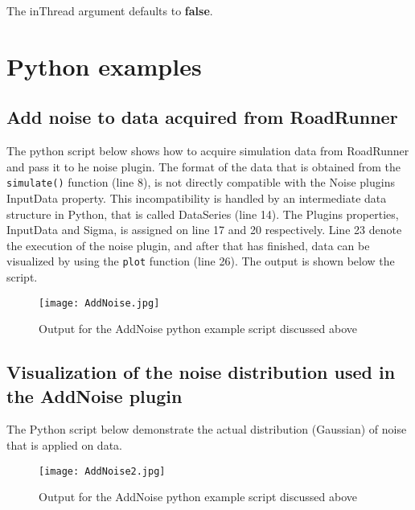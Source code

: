The inThread argument defaults to \textbf{false}.

\section{Python examples}

\subsection{Add noise to data acquired from RoadRunner}
The python script below shows how to acquire simulation data from RoadRunner and pass it to he noise plugin. The format of the data that is obtained from the \verb|simulate()| function (line 8), is not directly compatible with the Noise plugins InputData property. This incompatibility is handled by an intermediate data structure in Python, that is called DataSeries (line 14). 
The Plugins properties, InputData and Sigma, is assigned on line 17 and 20 respectively. Line 23 denote the execution of the noise plugin, and after that has finished, data can be visualized by using the \verb|plot| function (line 26). The output is shown below the script. 

\begin{singlespace}

\end{singlespace}

\begin{figure}[H]
\centering
\texttt{[image: AddNoise.jpg]}
\caption{Output for the AddNoise python example script discussed above}
\label{fig:addNoiseFig1}
\end{figure}

\subsection{Visualization of the noise distribution used in the AddNoise plugin}
The Python script below demonstrate the actual distribution (Gaussian) of noise that is applied on data.

\begin{singlespace}

\end{singlespace}

\begin{figure}[H]
\centering
\texttt{[image: AddNoise2.jpg]}
\caption{Output for the AddNoise python example script discussed above}
\label{fig:addNoiseFig2}
\end{figure}

 







